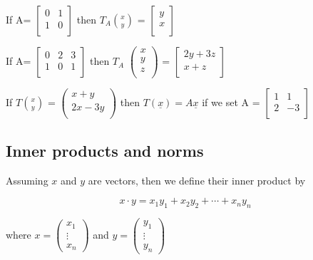 \documentclass[12pt,a4paper]{article}
\theoremstyle{regla}
\theoremstyle{remark}
\theoremstyle{definition}
\theoremstyle{nonumberbreak}
\begin{document}
\begin{xmpl}
If A=
$\begin{bmatrix}
0 & 1  \\
1 & 0  \\
\end{bmatrix}$ then $ T_A{x \choose y}$ =  
$\begin{bmatrix}
y  \\
x  \\
\end{bmatrix}$
\end{xmpl}
\begin{xmpl}

 If A=
$\begin{bmatrix}
0 & 2 & 3\\
1 & 0 & 1 \\
\end{bmatrix}$ then $T_A$
$\left(
\begin{array}{ccc}
   x \\
  y\\
  z\\
 \end{array} \right)$ = 
$\begin{bmatrix}
2y + 3z\\
x + z \\
\end{bmatrix}$
\end{xmpl}
\begin{xmpl}

If $T{x \choose y }$ = 
$\left(
 \begin{array}{cc}
   x+y  \\
  2x-3y\\
 \end{array} \right)$ then $T (\underline{x}) = A \underline{x}$ if  we set A = 
$\begin{bmatrix}
1 & 1 \\
2 & -3 \\
\end{bmatrix}$
 \end{xmpl}

\subsection{Inner products and norms}
\begin{fbox}
\begin{minipage}{0.97\textwidth}
Assuming $x$ and $y$ are vectors, then we define their inner product by 

$$x \cdot y = x_1y_1 + x_2y_2 + \cdots + x_ny_n$$

where $x =\begin{pmatrix}
x_1\\
\vdots\\
x_n
\end{pmatrix}$ and $y= \begin{pmatrix}
y_1\\
\vdots\\
y_n
\end{pmatrix}$ 


\end{minipage}
\end{fbox}
\end{document}
